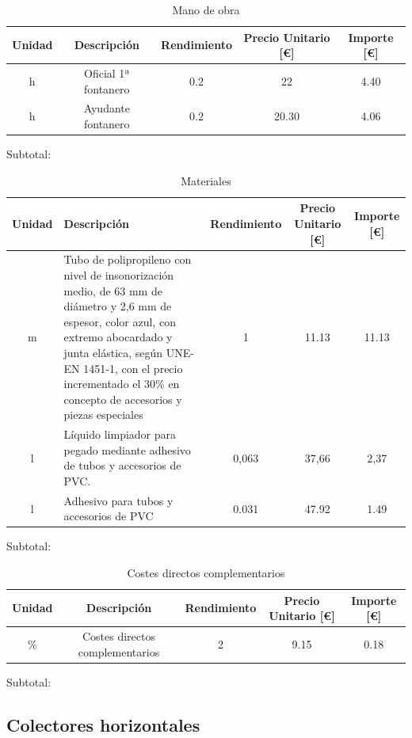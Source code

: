 \documentclass[../main.tex]{subfiles}
\begin{document}
\begin{table}[H]
    \centering
    \begin{tabular}{c|c|c|c|c}
    Unidad & Descripción & Rendimiento & Precio Unitario [€] & Importe [€] \\ \hline
    h&Oficial 1ª fontanero & 0.2 & 22 & 4.40 \\
    h&Ayudante fontanero & 0.2 & 20.30 & 4.06 \\
    
    \end{tabular}
    \caption{Mano de obra}
\end{table}

Subtotal:

\begin{table}[H]
    \centering
    \begin{tabular}{c|p{5.5cm}|c|c|c}
    Unidad & Descripción & Rendimiento & Precio Unitario [€] & Importe [€] \\ \hline
    m&Tubo de polipropileno con nivel de insonorización medio, de 63 mm de diámetro y 2,6 mm de espesor, color azul, con extremo abocardado y junta elástica, según UNE-EN 1451-1, con el precio incrementado el 30\% en concepto de accesorios y piezas especiales& 1 & 11.13 & 11.13 \\
    l & Líquido limpiador para pegado mediante adhesivo de tubos y accesorios de PVC. & 0,063 & 37,66 & 2,37 \\
    l & Adhesivo para tubos y accesorios de PVC & 0.031 & 47.92 & 1.49 \\
    \end{tabular}
    \caption{Materiales}
\end{table}

Subtotal:

\begin{table}[H]
    \centering
    \begin{tabular}{c|c|c|c|c}
    Unidad & Descripción & Rendimiento & Precio Unitario [€] & Importe [€] \\ \hline
    \% & Costes directos complementarios & 2 & 9.15 & 0.18 \\
    \end{tabular}
    \caption{Costes directos complementarios}
\end{table} 

Subtotal:

\subsection{Colectores horizontales}
\end{document}
